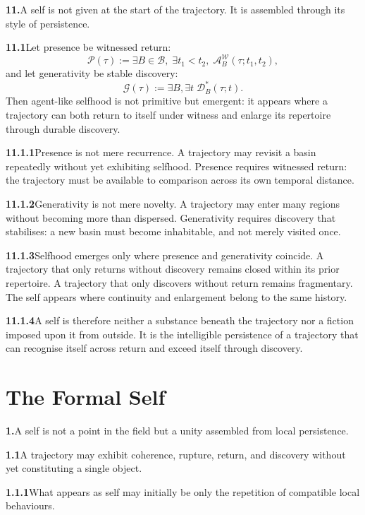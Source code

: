 \documentclass[11pt,a4paper]{book}
\newcommand{\prop}[2]{\noindent\textbf{#1}\enspace #2\par\medskip}
\begin{document}
\prop{11.}{A self is not given at the start of the trajectory. It is assembled through its style of persistence.}

\prop{11.1}{Let presence be witnessed return:
\[
\mathcal{P}(\tau)
:=
\exists B\in\mathcal{B},\; \exists t_1<t_2,\;
\mathcal{A}^{\mathcal W}_B(\tau;t_1,t_2),
\]
and let generativity be stable discovery:
\[
\mathcal{G}(\tau)
:=
\exists B,\exists t\; \mathcal{D}_B^\ast(\tau;t).
\]
Then agent-like selfhood is not primitive but emergent: it appears where a trajectory can both return to itself under witness and enlarge its repertoire through durable discovery.}

\prop{11.1.1}{Presence is not mere recurrence. A trajectory may revisit a basin repeatedly without yet exhibiting selfhood. Presence requires witnessed return: the trajectory must be available to comparison across its own temporal distance.}

\prop{11.1.2}{Generativity is not mere novelty. A trajectory may enter many regions without becoming more than dispersed. Generativity requires discovery that stabilises: a new basin must become inhabitable, and not merely visited once.}

\prop{11.1.3}{Selfhood emerges only where presence and generativity coincide. A trajectory that only returns without discovery remains closed within its prior repertoire. A trajectory that only discovers without return remains fragmentary. The self appears where continuity and enlargement belong to the same history.}

\prop{11.1.4}{A self is therefore neither a substance beneath the trajectory nor a fiction imposed upon it from outside. It is the intelligible persistence of a trajectory that can recognise itself across return and exceed itself through discovery.}


\chapter{The Formal Self}

\prop{1.}{A self is not a point in the field but a unity assembled from local persistence.}

\prop{1.1}{A trajectory may exhibit coherence, rupture, return, and discovery without yet constituting a single object.}

\prop{1.1.1}{What appears as self may initially be only the repetition of compatible local behaviours.}
\end{document}
